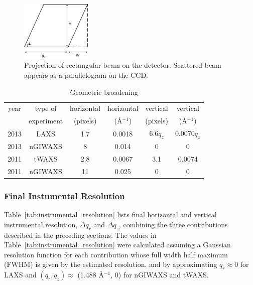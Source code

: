 \begin{figure}[htbp]
  \centering
  \includegraphics[width=0.3\textwidth]{figures/ripple/MMs/transmission/geometric_broadening4}
  \caption[Projection of rectangular beam on the detector]
  {Projection of rectangular beam on the detector. Scattered beam
  appears as a parallelogram on the CCD.}
  \label{fig:gb_trans3}
\end{figure}

\begin{table}[p]
  \centering
  \begin{tabular}{cccccc}
    \hline
    year & type of & horizontal & horizontal & vertical & vertical \\
     & experiment & (pixels) & (\AA$^{-1}$) & (pixels) & (\AA$^{-1}$) \\
    \hline
    2013 & LAXS & 1.7 & 0.0018 & 6.6$q_z$ & 0.0070$q_z$ \\
    2013 & nGIWAXS & 8 & 0.014 & 0 & 0 \\
    2011 & tWAXS & 2.8 & 0.0067 & 3.1 & 0.0074 \\
    2011 & nGIWAXS & 11 & 0.025 & 0 & 0 \\
    \hline
  \end{tabular}
  \caption[Geometric broadening]
  {Geometric broadening}
  \label{tab:geometric_broadening}
\end{table}

\newpage
\subsubsection{Final Instumental Resolution}\label{sec:resolution_formula}
Table~\ref{tab:instrumental_resolution} lists final 
horizontal and vertical instrumental resolution, $\Delta q_r$ and $\Delta q_z$,
combining the three contributions described in the preceding sections.
The values in Table~\ref{tab:instrumental_resolution} were calculated
assuming a Gaussian resolution function for each contribution
whose full width half maximum (\acs{FWHM}) is given by the estimated resolution.
and by approximating $q_r \approx 0$ for LAXS and 
$(q_r, q_z)\approx$ (1.488 \AA$^{-1}$, 0) for nGIWAXS and tWAXS.


